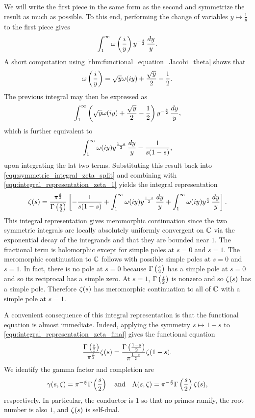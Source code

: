    We will write the first piece in the same form as the second and symmetrize the result as much as possible. To this end, performing the change of variables \(y \mapsto \frac{1}{y}\) to the first piece gives
    \[
      \int_{1}^{\infty}\omega\left(\frac{i}{y}\right)y^{-\frac{s}{2}}\,\frac{dy}{y}.
    \]
    A short computation using \cref{thm:functional_equation_Jacobi_theta} shows that
    \[
      \omega\left(\frac{i}{y}\right) = \sqrt{y}\omega(iy)+\frac{\sqrt{y}}{2}-\frac{1}{2}.
    \]
    The previous integral may then be expressed as
    \[
      \int_{1}^{\infty}\left(\sqrt{y}\omega(iy)+\frac{\sqrt{y}}{2}-\frac{1}{2}\right)y^{-\frac{s}{2}}\,\frac{dy}{y},
    \]
    which is further equivalent to
    \[
      \int_{1}^{\infty}\omega(iy)y^{\frac{1-s}{2}}\,\frac{dy}{y}-\frac{1}{s(1-s)},
    \]
    upon integrating the lat two terms. Substituting this result back into \cref{equ:symmetric_integral_zeta_split} and combining with \cref{equ:integral_representation_zeta_1} yields the integral representation
    \begin{equation}\label{equ:integral_representation_zeta_final}
      \zeta(s) = \frac{\pi^{\frac{s}{2}}}{\Gamma\left(\frac{s}{2}\right)}\left[-\frac{1}{s(1-s)}+\int_{1}^{\infty}\omega(iy)y^{\frac{1-s}{2}}\,\frac{dy}{y}+\int_{1}^{\infty}\omega(iy)y^{\frac{s}{2}}\,\frac{dy}{y}\right].
    \end{equation}
    This integral representation gives meromorphic continuation since the two symmetric integrals are locally absolutely uniformly convergent on \(\mathbb{C}\) via the exponential decay of the integrands and that they are bounded near \(1\). The fractional term is holomorphic except for simple poles at \(s = 0\) and \(s = 1\). The meromorphic continuation to \(\mathbb{C}\) follows with possible simple poles at \(s = 0\) and \(s = 1\). In fact, there is no pole at \(s = 0\) because \(\Gamma\left(\frac{s}{2}\right)\) has a simple pole at \(s = 0\) and so its reciprocal has a simple zero. At \(s = 1\), \(\Gamma\left(\frac{s}{2}\right)\) is nonzero and so \(\zeta(s)\) has a simple pole. Therefore \(\zeta(s)\) has meromorphic continuation to all of \(\mathbb{C}\) with a simple pole at \(s = 1\).

    A convenient consequence of this integral representation is that the functional equation is almost immediate. Indeed, applying the symmetry \(s \mapsto 1-s\) to \cref{equ:integral_representation_zeta_final} gives the functional equation
    \[
      \frac{\Gamma\left(\frac{s}{2}\right)}{\pi^{\frac{s}{2}}}\zeta(s) = \frac{\Gamma\left(\frac{1-s}{2}\right)}{\pi^{\frac{1-s}{2}}}\zeta(1-s).
    \]
    We identify the gamma factor and completion are 
    \[
      \gamma(s,\zeta) = \pi^{-\frac{s}{2}}\Gamma\left(\frac{s}{2}\right) \quad \text{and} \quad \Lambda(s,\zeta) = \pi^{-\frac{s}{2}}\Gamma\left(\frac{s}{2}\right)\zeta(s),
    \]
    respectively. In particular, the conductor is \(1\) so that no primes ramify, the root number is also \(1\), and \(\zeta(s)\) is self-dual.
    
